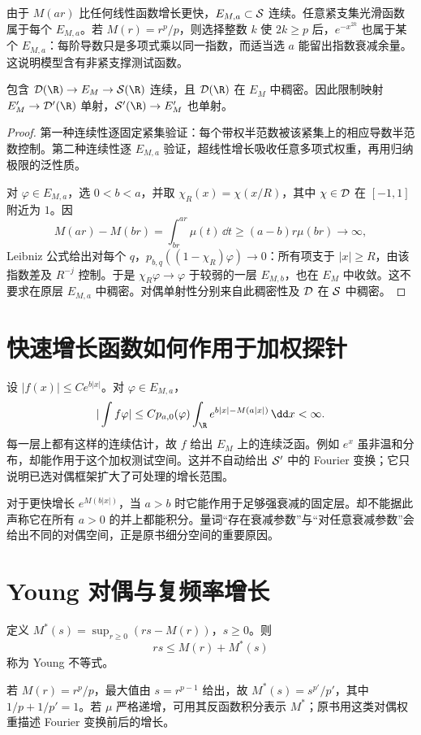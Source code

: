 由于 $M(ar)$ 比任何线性函数增长更快，$E_{M,a}\subset\mathcal{S}$ 连续。任意紧支集光滑函数属于每个 $E_{M,a}$。若 $M(r)=r^p/p$，则选择整数 $k$ 使 $2k\ge p$ 后，$e^{-x^{2k}}$ 也属于某个 $E_{M,a}$：每阶导数只是多项式乘以同一指数，而适当选 $a$ 能留出指数衰减余量。这说明模型含有非紧支撑测试函数。

\begin{proposition}[模型空间的稠密嵌入]\label{prop:weighted-density}
包含 $\Test(\R)\to E_M\to\Sch(\R)$ 连续，且 $\Test(\R)$ 在 $E_M$ 中稠密。因此限制映射 $E_M'\to\Dist(\R)$ 单射，$\Temp(\R)\to E_M'$ 也单射。
\end{proposition}
\begin{proof}
第一种连续性逐固定紧集验证：每个带权半范数被该紧集上的相应导数半范数控制。第二种连续性逐 $E_{M,a}$ 验证，超线性增长吸收任意多项式权重，再用归纳极限的泛性质。

对 $\varphi\in E_{M,a}$，选 $0<b<a$，并取 $\chi_R(x)=\chi(x/R)$，其中 $\chi\in\mathcal{D}$ 在 $[-1,1]$ 附近为 $1$。因
\[
 M(ar)-M(br)=\int_{br}^{ar}\mu(t)\,\dd t
 \ge (a-b)r\mu(br)\longrightarrow\infty,
\]
Leibniz 公式给出对每个 $q$，$p_{b,q}((1-\chi_R)\varphi)\to0$：所有项支于 $|x|\ge R$，由该指数差及 $R^{-j}$ 控制。于是 $\chi_R\varphi\to\varphi$ 于较弱的一层 $E_{M,b}$，也在 $E_M$ 中收敛。这不要求在原层 $E_{M,a}$ 中稠密。对偶单射性分别来自此稠密性及 $\mathcal{D}$ 在 $\mathcal{S}$ 中稠密。
\end{proof}

\section{快速增长函数如何作用于加权探针}
设 $|f(x)|\le Ce^{b|x|}$。对 $\varphi\in E_{M,a}$，
\[
 |\int f\varphi|\le Cp_{a,0}(\varphi)
 \int_\R e^{b|x|-M(a|x|)}\,\dd x<\infty.
\]
每一层上都有这样的连续估计，故 $f$ 给出 $E_M$ 上的连续泛函。例如 $e^x$ 虽非温和分布，却能作用于这个加权测试空间。这并不自动给出 $\mathcal{S}'$ 中的 Fourier 变换；它只说明已选对偶框架扩大了可处理的增长范围。

对于更快增长 $e^{M(b|x|)}$，当 $a>b$ 时它能作用于足够强衰减的固定层。却不能据此声称它在所有 $a>0$ 的并上都能积分。量词“存在衰减参数”与“对任意衰减参数”会给出不同的对偶空间，正是原书细分空间的重要原因。

\section{Young 对偶与复频率增长}
\begin{definition}[凸共轭]
定义 $M^*(s)=\sup_{r\ge0}(rs-M(r))$，$s\ge0$。则
\begin{equation}\label{eq:young-conjugate}
 rs\le M(r)+M^*(s)
\end{equation}
称为 Young 不等式。
\end{definition}
若 $M(r)=r^p/p$，最大值由 $s=r^{p-1}$ 给出，故 $M^*(s)=s^{p'}/p'$，其中 $1/p+1/p'=1$。若 $\mu$ 严格递增，可用其反函数积分表示 $M^*$；原书用这类对偶权重描述 Fourier 变换前后的增长。

